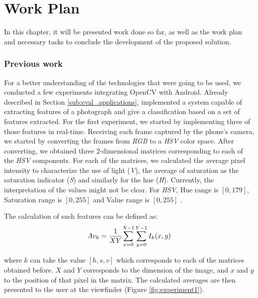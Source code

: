 \chapter{Work Plan}
\label{cha:work_plan}

In this chapter, it will be presented work done so far, as well as the work plan and necessary tasks to conclude the development of the proposed solution.

\subsection{Previous work}

For a better understanding of the technologies that were going to be used, we conducted a few experiments integrating OpenCV with Android.
Already described in Section \ref{sub:eval_applications}, \citeauthor{Datta} \cite{Datta} implemented a system capable of extracting features of a photograph and give a classification based on a set of features extracted.
For the first experiment, we started by implementing three of those features in real-time. Receiving each frame captured by the phone's camera, we started by converting the frames from \emph{RGB} to a \emph{HSV} color space. After converting, we obtained three 2-dimensional matrices corresponding to each of the \emph{HSV} components. For each of the matrices, we calculated the average pixel intensity to characterize the use of light (\emph{V}), the average of saturation as the saturation indicator (\emph{S}) and similarly for the hue (\emph{H}). Currently, the interpretation of the values might not be clear. For \emph{HSV}, Hue range is $[0,179]$, Saturation range is $[0,255]$ and Value range is $[0,255]$ \cite{OCV}.

The calculation of such features can be defined as:
\begin{equation}
Av_{k} = {{1 \over XY} {\sum_{x=0}^{X-1}{\sum_{y=0}^{Y-1}{I_{k}(x,y)}}}}
\label{eq:average_hsv}
\end{equation}

where $k$ can take the value $[h,s,v]$ which corresponds to each of the matrices obtained before. $X$ and $Y$ corresponds to the dimension of the image, and $x$ and $y$ to the position of that pixel in the matrix.
The calculated averages are then presented to the user at the viewfinder (Figure \ref{fig:experiment1}).

